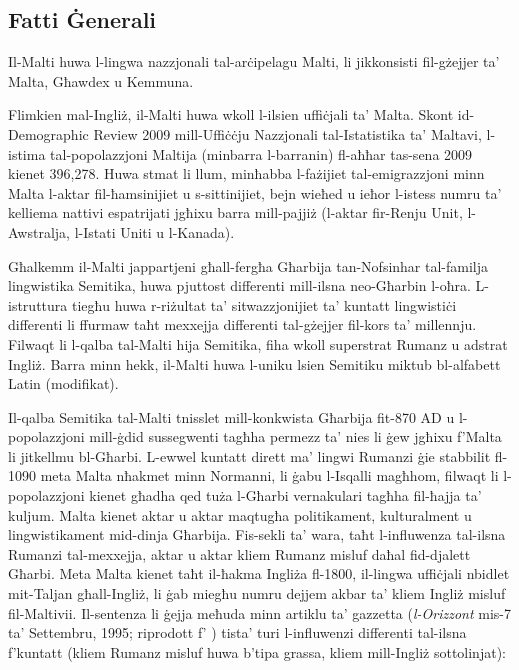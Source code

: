 \documentclass[]{../../metanetpaper}
\begin{document}
\begin{multicols}{2}

\subsection{Fatti Ġenerali}

Il-Malti huwa l-lingwa nazzjonali tal-arċipelagu Malti, li jikkonsisti fil-gżejjer ta’ Malta, Għawdex u Kemmuna.
    
Flimkien mal-Ingliż, il-Malti huwa wkoll l-ilsien uffiċjali ta’ Malta. Skont id-Demographic Review 2009 mill-Uffiċċju Nazzjonali tal-Istatistika ta’ Maltavi, l-istima tal-popolazzjoni Maltija (minbarra l-barranin) fl-aħħar tas-sena 2009 kienet 396,278. Huwa stmat li llum, minħabba l-fażijiet tal-emigrazzjoni minn Malta l-aktar fil-ħamsinijiet u s-sittinijiet, bejn wieħed u ieħor l-istess numru ta’ kelliema nattivi espatrijati jgħixu barra mill-pajjiż (l-aktar fir-Renju Unit, l-Awstralja, l-Istati Uniti u l-Kanada).
    
Għalkemm il-Malti jappartjeni għall-fergħa Għarbija tan-Nofsinhar tal-familja lingwistika Semitika, huwa pjuttost differenti mill-ilsna neo-Għarbin l-oħra. L-istruttura tiegħu huwa r-riżultat ta’ sitwazzjonijiet ta’ kuntatt lingwistiċi differenti li ffurmaw taħt mexxejja differenti tal-gżejjer fil-kors ta' millennju. Filwaqt li l-qalba tal-Malti hija Semitika, fiha wkoll superstrat Rumanz u adstrat Ingliż. Barra minn hekk, il-Malti huwa l-uniku lsien Semitiku miktub bl-alfabett Latin (modifikat).
    
Il-qalba Semitika tal-Malti tnisslet mill-konkwista Għarbija fit-870 AD u l-popolazzjoni mill-ġdid sussegwenti tagħha permezz ta’ nies li ġew jgħixu f’Malta li jitkellmu bl-Għarbi. L-ewwel kuntatt dirett ma’ lingwi Rumanzi ġie stabbilit fl-1090 meta Malta nħakmet minn Normanni, li ġabu l-Isqalli magħhom, filwaqt li l-popolazzjoni kienet għadha qed tuża l-Għarbi vernakulari tagħha fil-ħajja ta’ kuljum. Malta kienet aktar u aktar maqtugħa politikament, kulturalment u lingwistikament mid-dinja Għarbija. Fis-sekli ta’ wara, taħt l-influwenza tal-ilsna Rumanzi tal-mexxejja, aktar u aktar kliem Rumanz misluf daħal fid-djalett Għarbi. Meta Malta kienet taħt il-ħakma Ingliża fl-1800, il-lingwa uffiċjali nbidlet mit-Taljan għall-Ingliż, li ġab miegħu numru dejjem akbar ta’ kliem Ingliż misluf fil-Maltivii. Il-sentenza li ġejja meħuda minn artiklu ta’ gazzetta (\emph{l-Orizzont} mis-7 ta’ Settembru, 1995; riprodott f’ \cite{Ambros:1998}) tista’ turi l-influwenzi differenti tal-ilsna f'kuntatt (kliem Rumanz misluf huwa b’tipa grassa, kliem mill-Ingliż sottolinjat):


\end{multicols}
\end{document}
